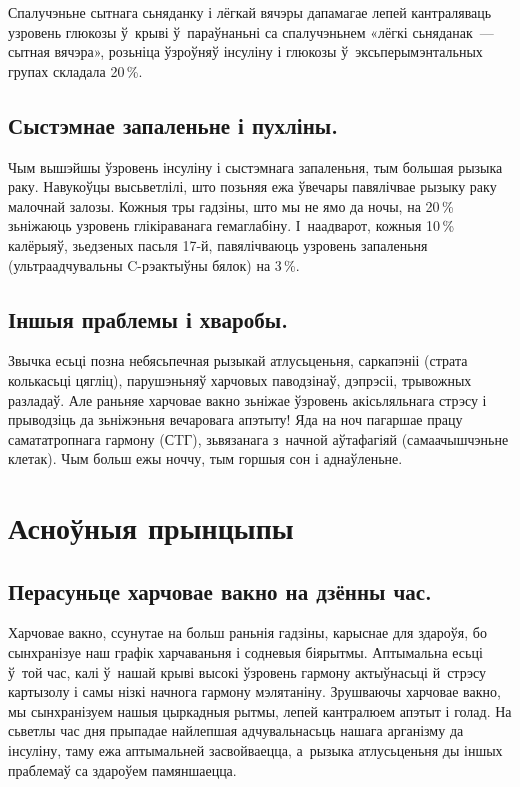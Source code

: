 Спалучэньне сытнага сьняданку і лёгкай вячэры дапамагае лепей кантраляваць узровень глюкозы ў~крыві ў~параўнаньні са спалучэньнем «лёгкі сьняданак~--- сытная вячэра», розьніца ўзроўняў інсуліну і глюкозы ў~эксьперымэнтальных групах складала 20\,\%.

\subsection{Сыстэмнае запаленьне і пухліны.}
Чым вышэйшы ўзровень інсуліну і сыстэмнага запаленьня, тым большая рызыка раку. Навукоўцы высьветлілі, што позьняя ежа ўвечары павялічвае рызыку раку малочнай залозы. Кожныя тры гадзіны, што мы не ямо да ночы, на 20\,\% зьніжаюць узровень глікіраванага гемаглабіну. І~наадварот, кожныя 10\,\% калёрыяў, зьедзеных пасьля 17-й, павялічваюць узровень запаленьня (ультраадчувальны C-рэактыўны бялок) на 3\,\%.

\subsection{Іншыя праблемы і хваробы.}
Звычка есьці позна небясьпечная рызыкай атлусьценьня, саркапэніі (страта колькасьці цягліц), парушэньняў харчовых паводзінаў, дэпрэсіі, трывожных разладаў. Але раньняе харчовае вакно зьніжае ўзровень акісьляльнага стрэсу і прыводзіць да зьніжэньня вечаровага апэтыту! Яда на ноч пагаршае працу самататропнага гармону (СTГ), зьвязанага з~начной аўтафагіяй (самаачышчэньне клетак). Чым больш ежы ноччу, тым горшыя сон і аднаўленьне.

\section{Асноўныя прынцыпы}

\subsection{Перасуньце харчовае вакно на дзённы час.}
Харчовае вакно, ссунутае на больш раньнія гадзіны, карыснае для здароўя, бо сынхранізуе наш графік харчаваньня і содневыя біярытмы. Аптымальна есьці ў~той час, калі ў~нашай крыві высокі ўзровень гармону актыўнасьці й~стрэсу картызолу і самы нізкі начнога гармону мэлятаніну. Зрушваючы харчовае вакно, мы сынхранізуем нашыя цыркадныя рытмы, лепей кантралюем апэтыт і голад. На сьветлы час дня прыпадае найлепшая адчувальнасьць нашага арганізму да інсуліну, таму ежа аптымальней засвойваецца, а~рызыка атлусьценьня ды іншых праблемаў са здароўем памяншаецца.

